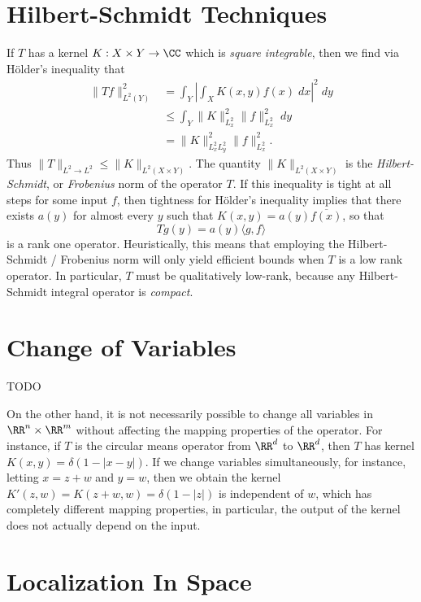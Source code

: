 \section{Hilbert-Schmidt Techniques}

If $T$ has a kernel $K: X \times Y \to \CC$ which is \emph{square integrable}, then we find via H\"{o}lder's inequality that
%
\begin{align*}
    \| T f \|_{L^2(Y)}^2 &= \int_Y \left| \int_X K(x,y) f(x)\; dx \right|^2\; dy\\
    &\leq \int_Y \| K \|_{L^2_x}^2 \| f \|_{L^2_x}^2\; dy\\
    &= \| K \|_{L^2_x L^2_y}^2 \| f \|_{L^2_x}^2.
\end{align*}
%
Thus $\| T \|_{L^2 \to L^2} \leq \| K \|_{L^2(X \times Y)}$. The quantity $\| K \|_{L^2(X \times Y)}$ is the \emph{Hilbert-Schmidt}, or \emph{Frobenius} norm of the operator $T$. If this inequality is tight at all steps for some input $f$, then tightness for H\"{o}lder's inequality implies that there exists $a(y)$ for almost every $y$ such that $K(x,y) = a(y) \overline{f(x)}$, so that
%
\[ Tg(y) = a(y) \langle g, f \rangle \]
%
is a rank one operator. Heuristically, this means that employing the Hilbert-Schmidt / Frobenius norm will only yield efficient bounds when $T$ is a low rank operator. In particular, $T$ must be qualitatively low-rank, because any Hilbert-Schmidt integral operator is \emph{compact}.

\section{Change of Variables}

TODO

On the other hand, it is not necessarily possible to change all variables in $\RR^n \times \RR^m$ without affecting the mapping properties of the operator. For instance, if $T$ is the circular means operator from $\RR^d$ to $\RR^d$, then $T$ has kernel $K(x,y) = \delta(1 - |x - y|)$. If we change variables simultaneously, for instance, letting $x = z + w$ and $y = w$, then we obtain the kernel $K'(z,w) = K(z + w, w) = \delta(1 - |z|)$ is independent of $w$, which has completely different mapping properties, in particular, the output of the kernel does not actually depend on the input.








\section{Localization In Space}

